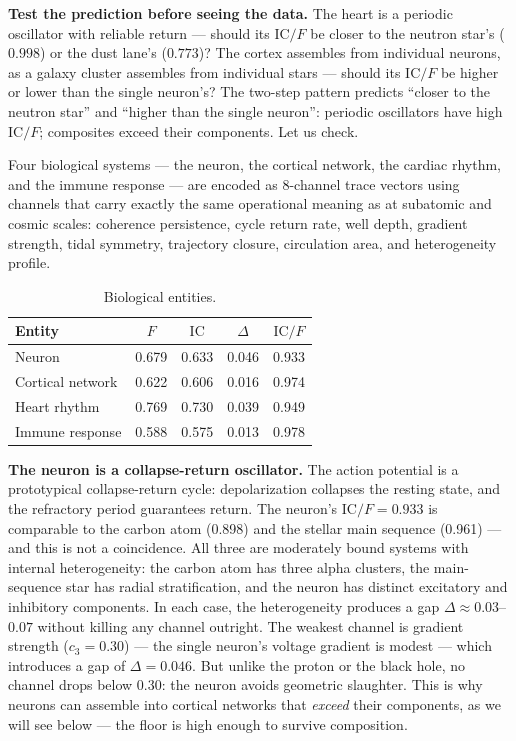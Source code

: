 \documentclass[
  aps,
  prd,
  twocolumn,
  superscriptaddress,
  nofootinbib,
  floatfix
]{revtex4-2}
\newcommand{\IC}{\mathrm{IC}}
\begin{document}
\textbf{Test the prediction before seeing the data.}
The heart is a periodic oscillator with
reliable return --- should its $\IC/F$ be closer to the
neutron star's ($0.998$) or the dust lane's ($0.773$)?  The
cortex assembles from individual neurons, as a galaxy cluster
assembles from individual stars --- should its $\IC/F$ be
higher or lower than the single neuron's?  The two-step
pattern predicts ``closer to the neutron star'' and ``higher
than the single neuron'': periodic oscillators have high
$\IC/F$; composites exceed their components.  Let us check.

Four biological systems --- the neuron, the
cortical network, the cardiac rhythm, and the immune response
--- are encoded as 8-channel trace vectors using channels
that carry exactly the same operational meaning as at
subatomic and cosmic scales: coherence persistence, cycle
return rate, well depth, gradient strength, tidal symmetry,
trajectory closure, circulation area, and heterogeneity
profile.

\begin{table}[t]
\caption{\label{tab:biological}Biological entities.}
\begin{ruledtabular}
\begin{tabular}{lcccc}
Entity & $F$ & $\IC$ & $\Delta$ & $\IC/F$ \\
\hline
Neuron            & 0.679 & 0.633 & 0.046 & 0.933 \\
Cortical network  & 0.622 & 0.606 & 0.016 & 0.974 \\
Heart rhythm      & 0.769 & 0.730 & 0.039 & 0.949 \\
Immune response   & 0.588 & 0.575 & 0.013 & 0.978 \\
\end{tabular}
\end{ruledtabular}
\end{table}

\textbf{The neuron is a collapse-return oscillator.}
The action potential is a prototypical collapse-return cycle:
depolarization collapses the resting state, and the refractory
period guarantees return.  The neuron's $\IC/F = 0.933$ is
comparable to the carbon atom (0.898) and the stellar main
sequence (0.961) --- and this is not a coincidence.  All three
are moderately bound systems with internal heterogeneity:
the carbon atom has three alpha clusters, the main-sequence
star has radial stratification, and the neuron has distinct
excitatory and inhibitory components.  In each case, the
heterogeneity produces a gap $\Delta \approx 0.03$--$0.07$
without killing any channel outright.
The weakest channel is gradient strength ($c_3 = 0.30$)
--- the single neuron's voltage gradient is modest ---
which introduces a gap of $\Delta = 0.046$.  But unlike
the proton or the black hole, no channel drops below $0.30$:
the neuron avoids geometric slaughter.  This is why neurons
can assemble into cortical networks that \emph{exceed} their
components, as we will see below --- the floor is high enough
to survive composition.
\end{document}
